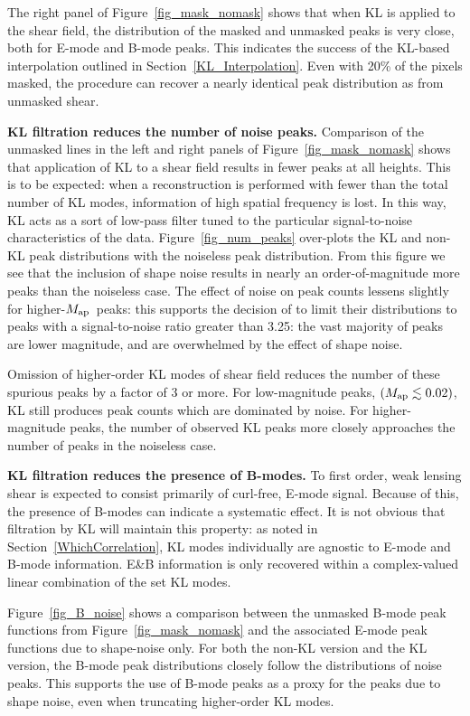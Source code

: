 \documentclass[twocolumn]{emulateapj}
\newcommand{\Map}{\ensuremath{M_{\rm ap}}\ }
\begin{document}
The right panel of Figure~\ref{fig_mask_nomask} shows that when 
KL is applied to the shear field, the distribution of the masked and
unmasked peaks is very close, both for E-mode and B-mode peaks.
This indicates the success of the KL-based interpolation outlined in
Section~\ref{KL_Interpolation}.  Even with 20\% of the pixels masked,
the procedure can recover a nearly identical peak distribution as 
from unmasked shear.

\textbf{KL filtration reduces the number of noise peaks.}
Comparison of the unmasked lines in the left and right panels of 
Figure~\ref{fig_mask_nomask} shows that application of KL to a shear
field results in fewer peaks at all heights.  This is to be expected:
when a reconstruction is performed with fewer than the total number
of KL modes, information of high spatial frequency is lost.  In this
way, KL acts as a sort of low-pass filter tuned to the particular
signal-to-noise characteristics of the data.  Figure~\ref{fig_num_peaks}
over-plots the KL and non-KL peak distributions with the noiseless
peak distribution.  From this figure we see that the inclusion of
shape noise results in nearly an order-of-magnitude more peaks than 
the noiseless case.  The effect of noise on peak counts lessens slightly 
for higher-\Map peaks: this supports the decision of \citet{Dietrich10} 
to limit their distributions to peaks with a signal-to-noise 
ratio greater than 3.25: the vast majority of peaks are lower 
magnitude, and are overwhelmed by the effect of shape noise.

Omission of higher-order KL modes of shear field reduces the number of
these spurious peaks by a factor of 3 or more.  For low-magnitude peaks,
$(M_{\rm ap}\lesssim 0.02)$, KL still produces peak counts which are 
dominated by noise. For higher-magnitude peaks, the number of observed 
KL peaks more closely approaches the number of peaks in the noiseless case.

\textbf{KL filtration reduces the presence of B-modes.}
To first order, weak lensing shear is expected to consist primarily of
curl-free, E-mode signal.  Because of this, the presence of B-modes can
indicate a systematic effect.  It is not obvious that filtration by KL
will maintain this property: as noted in Section~\ref{WhichCorrelation},
KL modes individually are agnostic to E-mode and B-mode information.  
E\&B information is only recovered within a 
complex-valued linear combination of the set KL modes.

Figure~\ref{fig_B_noise} shows a comparison between the unmasked
B-mode peak functions from Figure~\ref{fig_mask_nomask} and the associated
E-mode peak functions due to shape-noise only.  For both the non-KL version
and the KL version, the B-mode peak distributions closely follow the
distributions of noise peaks.  This supports the use of B-mode peaks as
a proxy for the peaks due to shape noise, even when truncating higher-order
KL modes.
\end{document}
